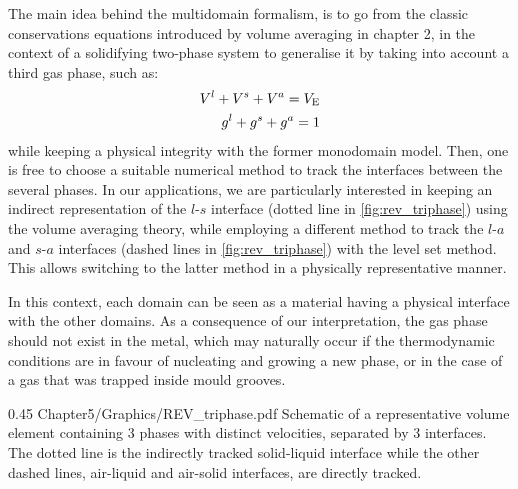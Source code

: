 The main idea behind the multidomain formalism, is to go from the classic 
conservations equations introduced by  volume averaging in chapter 2,
in the context of a solidifying two-phase system to generalise it by taking
into account a third gas phase, such as:
\begin{align}
\label{eq:}
V^l + V^s + V^a = V_\text{E} \\
{g^l} + {g^s} + {g^a} = 1
\end{align} 
while keeping a physical integrity with the former monodomain model. 
Then, one is free to choose a suitable numerical method to track the 
interfaces between the several phases. In our applications, we are particularly 
interested in keeping an indirect representation of the $l$-$s$ interface (dotted line in \cref{fig:rev_triphase})
using the volume averaging theory, while employing a different
method to track the $l$-$a$ and $s$-$a$ interfaces (dashed lines in \cref{fig:rev_triphase}) with the level set method. 
This allows switching to the latter method in a physically representative manner.

In this context, each domain can be seen as a material having a physical
interface with the other domains. As a consequence of our interpretation, 
the gas phase should not exist in the metal, which may naturally
occur if the thermodynamic conditions are in favour of nucleating and growing 
a new phase, or in the case of a gas that was trapped inside mould grooves.
\begin{figureth}
{0.45}
{Chapter5/Graphics/REV_triphase.pdf}
{Schematic of a representative volume element containing 3 phases with distinct velocities, separated by 3 interfaces.
The dotted line is the indirectly tracked solid-liquid interface while the other dashed lines, air-liquid and air-solid
interfaces, are directly tracked.}
\label{fig:rev_triphase}
\end{figureth}
%
%
